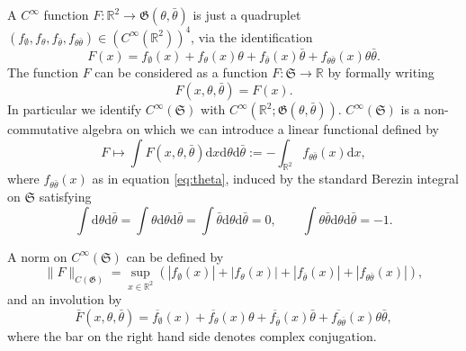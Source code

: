\documentclass[a4paper,10pt]{article}
\newcommand{\assign}{:=}
\newcommand{\mathd}{\mathrm{d}}
\begin{document}
A $C^{\infty}$ function $F : \mathbb{R}^2 \rightarrow \mathfrak{G} (\theta,
\bar{\theta})$ is just a quadruplet $(f_{\emptyset}, f_{\theta},
f_{\bar{\theta}}, f_{\theta \bar{\theta}}) \in (C^{\infty} (\mathbb{R}^2))^4$,
via the identification
\begin{equation}
  F (x) = f_{\emptyset} (x) + f_{\theta} (x) \theta + f_{\bar{\theta}} (x)
  \bar{\theta} + f_{\theta \bar{\theta}} (x) \theta \bar{\theta} .
  \label{eq:theta}
\end{equation}
The function $F$ can be considered as a function $F : \mathfrak{S} \rightarrow
\mathbb{R}$ by formally writing
\[ F (x, \theta, \bar{\theta}) = F (x) . \]
In particular we identify $C^{\infty} (\mathfrak{S})$ with $C^{\infty}
(\mathbb{R}^2 ; \mathfrak{G} (\theta, \bar{\theta}))$. $C^{\infty}
(\mathfrak{S})$ is a non-commutative algebra on which we can introduce a
linear functional defined by
\[ F \mapsto \int F (x, \theta, \bar{\theta}) \mathd x \mathd \theta \mathd
   \bar{\theta} \assign - \int_{\mathbb{R}^2} f_{\theta \bar{\theta}} (x)
   \mathd x, \]
where $f_{\theta \bar{\theta}} (x)$ as in equation {\eqref{eq:theta}}, induced
by the standard Berezin integral on $\mathfrak{S}$ satisfying
\[ \int \mathd \theta \mathd \bar{\theta} = \int \theta \mathd \theta \mathd
   \bar{\theta} = \int \bar{\theta} \mathd \theta \mathd \bar{\theta} = 0,
   \qquad \int \theta \bar{\theta} \mathd \theta \mathd \bar{\theta} = - 1. \]
\begin{remark}
  A norm on $C^{\infty} (\mathfrak{S})$ can be defined by
  \[ \| F \|_{C (\mathfrak{G})} = \sup_{x \in \mathbb{R}^2} (| f_{\emptyset}
     (x) | + | f_{\theta} (x) | + | f_{\bar{\theta}} (x) | + | f_{\theta
     \bar{\theta}} (x) |), \]
  and an involution by
  \[ \bar{F} (x, \theta, \bar{\theta}) = \overline{f_{\emptyset}} (x) +
     \overline{f_{\theta}} (x) \theta + \overline{f_{\bar{\theta}}} (x)
     \bar{\theta} + \overline{f_{\theta \bar{\theta}}} (x) \theta
     \bar{\theta}, \]
  where the bar on the right hand side denotes complex conjugation.
\end{remark}
\end{document}
